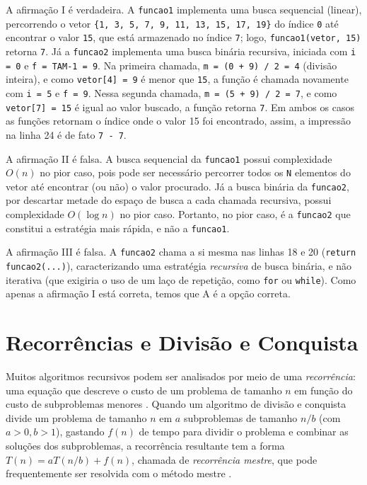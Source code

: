 \documentclass[12pt,a4paper]{article}
\begin{document}
A afirmação I é verdadeira. A \texttt{funcao1} implementa uma busca sequencial (linear),
percorrendo o vetor \texttt{\{1, 3, 5, 7, 9, 11, 13, 15, 17, 19\}} do índice \texttt{0} até encontrar o valor \texttt{15},
que está armazenado no índice \texttt{7}; logo, \texttt{funcao1(vetor, 15)} retorna \texttt{7}.
Já a \texttt{funcao2} implementa uma busca binária recursiva, iniciada com \texttt{i = 0} e \texttt{f = TAM-1 = 9}.
Na primeira chamada, \texttt{m = (0 + 9) / 2 = 4} (divisão inteira), e como \texttt{vetor[4] = 9} é menor que \texttt{15},
a função é chamada novamente com \texttt{i = 5} e \texttt{f = 9}.
Nessa segunda chamada, \texttt{m = (5 + 9) / 2 = 7}, e como \texttt{vetor[7] = 15} é igual ao valor buscado,
a função retorna \texttt{7}. Em ambos os casos as funções retornam o índice onde o valor 15 foi encontrado, assim, a impressão na linha 24 é de fato \texttt{7 - 7}.

A afirmação II é falsa. A busca sequencial da \texttt{funcao1} possui complexidade $O(n)$ no pior caso,
pois pode ser necessário percorrer todos os \texttt{N} elementos do vetor até encontrar (ou não) o valor procurado.
Já a busca binária da \texttt{funcao2}, por descartar metade do espaço de busca a cada chamada recursiva,
possui complexidade $O(\log n)$ no pior caso. Portanto, no pior caso, é a \texttt{funcao2} que constitui a estratégia mais rápida, e não a \texttt{funcao1}.

A afirmação III é falsa. A \texttt{funcao2} chama a si mesma nas linhas 18 e 20 (\texttt{return funcao2(...)}),
caracterizando uma estratégia \emph{recursiva} de busca binária, e não iterativa (que exigiria o uso de um laço de repetição, como \texttt{for} ou \texttt{while}).
Como apenas a afirmação I está correta, temos que A é a opção correta.

\section{Recorrências e Divisão e Conquista}\label{sec:recorrencia}
Muitos algoritmos recursivos podem ser analisados por meio de uma \emph{recorrência}:
uma equação que descreve o custo de um problema de tamanho $n$ em função do custo de subproblemas menores
\parencite[cap.~4]{clrs2022}.
Quando um algoritmo de divisão e conquista divide um problema de tamanho $n$ em $a$ subproblemas de tamanho $n/b$ (com $a > 0, b > 1$),
gastando $f(n)$ de tempo para dividir o problema e combinar as soluções dos subproblemas,
a recorrência resultante tem a forma $T(n) = aT(n/b) + f(n)$, chamada de \emph{recorrência mestre},
que pode frequentemente ser resolvida com o método mestre \parencite[seç.~4.5]{clrs2022}.
\end{document}
